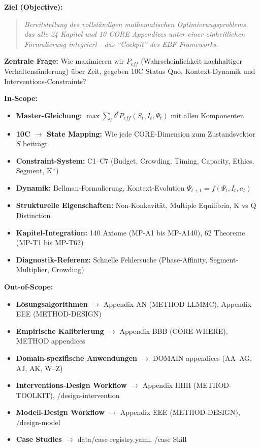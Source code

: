 \begin{tcolorbox}[colback=orange!5!white, colframe=orange!75!black,
    title=\textbf{Appendix Scope: Ziel / In-Scope / Out-of-Scope / Lieferobjekte}]

\textbf{Ziel (Objective):}
\begin{quote}
\textit{Bereitstellung des vollständigen mathematischen Optimierungsproblems, das alle 24 Kapitel
und 10 CORE Appendices unter einer einheitlichen Formulierung integriert---das ``Cockpit'' des EBF Frameworks.}
\end{quote}

\textbf{Zentrale Frage:} Wie maximieren wir $P_{eff}$ (Wahrscheinlichkeit nachhaltiger Verhaltensänderung)
über Zeit, gegeben 10C Status Quo, Kontext-Dynamik und Interventions-Constraints?

\vspace{0.5em}
\textbf{In-Scope:}
\begin{itemize}[nosep]
    \item \textbf{Master-Gleichung:} $\max \sum_t \delta^t P_{eff}(S_t, I_t, \Psi_t)$ mit allen Komponenten
    \item \textbf{10C $\to$ State Mapping:} Wie jede CORE-Dimension zum Zustandsvektor $S$ beiträgt
    \item \textbf{Constraint-System:} C1--C7 (Budget, Crowding, Timing, Capacity, Ethics, Segment, K*)
    \item \textbf{Dynamik:} Bellman-Formulierung, Kontext-Evolution $\Psi_{t+1} = f(\Psi_t, I_t, a_t)$
    \item \textbf{Strukturelle Eigenschaften:} Non-Konkavität, Multiple Equilibria, K vs Q Distinction
    \item \textbf{Kapitel-Integration:} 140 Axiome (MP-A1 bis MP-A140), 62 Theoreme (MP-T1 bis MP-T62)
    \item \textbf{Diagnostik-Referenz:} Schnelle Fehlersuche (Phase-Affinity, Segment-Multiplier, Crowding)
\end{itemize}

\vspace{0.5em}
\textbf{Out-of-Scope:}
\begin{itemize}[nosep]
    \item \textbf{Lösungsalgorithmen} $\rightarrow$ Appendix AN (METHOD-LLMMC), Appendix EEE (METHOD-DESIGN)
    \item \textbf{Empirische Kalibrierung} $\rightarrow$ Appendix BBB (CORE-WHERE), METHOD appendices
    \item \textbf{Domain-spezifische Anwendungen} $\rightarrow$ DOMAIN appendices (AA--AG, AJ, AK, W--Z)
    \item \textbf{Interventions-Design Workflow} $\rightarrow$ Appendix HHH (METHOD-TOOLKIT), /design-intervention
    \item \textbf{Modell-Design Workflow} $\rightarrow$ Appendix EEE (METHOD-DESIGN), /design-model
    \item \textbf{Case Studies} $\rightarrow$ data/case-registry.yaml, /case Skill
\end{itemize}


\end{tcolorbox}
